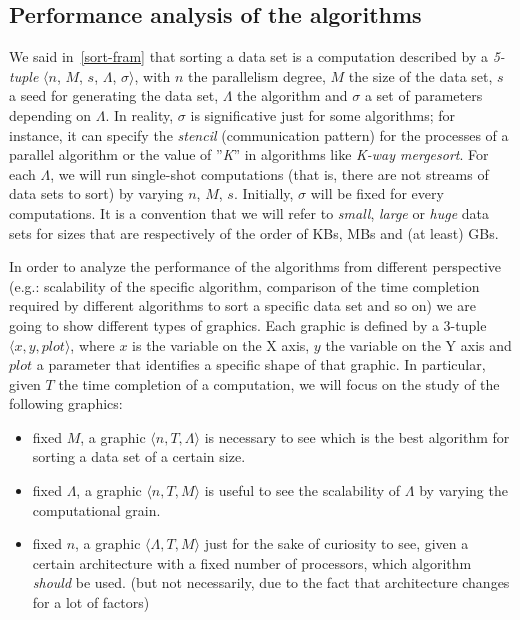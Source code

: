 \subsection{Performance analysis of the algorithms}
We said in~\ref{sort-fram} that sorting a data set is a computation described by a \textit{5-tuple} $\langle n$, $M$, $s$, $\Lambda$, $\sigma \rangle$, with $n$ the parallelism degree, $M$ the size of the data set, $s$ a seed for generating the data set, $\Lambda$ the algorithm and $\sigma$ a set of parameters depending on $\Lambda$. In reality, $\sigma$ is significative just for some algorithms; for instance, it can specify the \textit{stencil} (communication pattern) for the processes of a parallel algorithm or the value of ''\textit{K}'' in algorithms like \textit{K-way mergesort}. For each $\Lambda$, we will run single-shot computations (that is, there are not streams of data sets to sort) by varying $n$, $M$, $s$. Initially, $\sigma$ will be fixed for every computations. It is a convention that we will refer to \textit{small}, \textit{large} or \textit{huge} data sets for sizes that are respectively of the order of KBs, MBs and (at least) GBs. 

In order to analyze the performance of the algorithms from different perspective (e.g.: scalability of the specific algorithm, comparison of the time completion required by different algorithms to sort a specific data set and so on) we are going to show different types of graphics. Each graphic is defined by a 3-tuple $\langle x, y, plot \rangle $, where $x$ is the variable on the X axis, $y$ the variable on the Y axis and $plot$ a parameter that identifies a specific shape of that graphic. In particular, given $T$ the time completion of a computation, we will focus on the study of the following graphics:
\begin{itemize}
\item fixed $M$, a graphic $\langle n, T, \Lambda \rangle $ is necessary to see which is the best algorithm for sorting a data set of a certain size. 
\item fixed $\Lambda$, a graphic $\langle n, T, M \rangle$ is useful to see the scalability of $\Lambda$ by varying the computational grain. 
\item fixed $n$, a graphic $\langle \Lambda, T, M \rangle$ just for the sake  of curiosity to see, given a certain architecture with a fixed number of processors, which algorithm \textit{should} be used. (but not necessarily, due to the fact that architecture changes for a lot of factors) 
\end{itemize}

